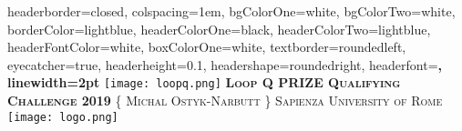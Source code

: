 \documentclass[landscape,a0paper,fontscale=0.285]{baposter} %
\begin{document}
\begin{poster}
{
headerborder=closed, %
colspacing=1em, %
bgColorOne=white, %
bgColorTwo=white, %
borderColor=lightblue, %
headerColorOne=black, %
headerColorTwo=lightblue, %
headerFontColor=white, %
boxColorOne=white, %
textborder=roundedleft, %
eyecatcher=true, %
headerheight=0.1\textheight, %
headershape=roundedright, %
headerfont=\Large\bf\textsc, %
linewidth=2pt %
}
%
{\texttt{[image: loopq.png]}} %
{\bf\textsc{Loop Q PRIZE Qualifying Challenge 2019}\vspace{0.5em}} %
{\textsc{\{ Michal Ostyk-Narbutt \} \hspace{12pt} Sapienza University of Rome}} %
{\texttt{[image: logo.png]}} %


\end{poster}
\end{document}
